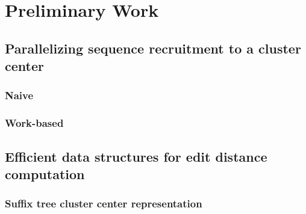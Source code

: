 \section{Preliminary Work}

\subsection{Parallelizing sequence recruitment to a cluster center}

\subsubsection{Naive}

\subsubsection{Work-based}


\subsection{Efficient data structures for edit distance computation}

\subsubsection{Suffix tree cluster center representation}

